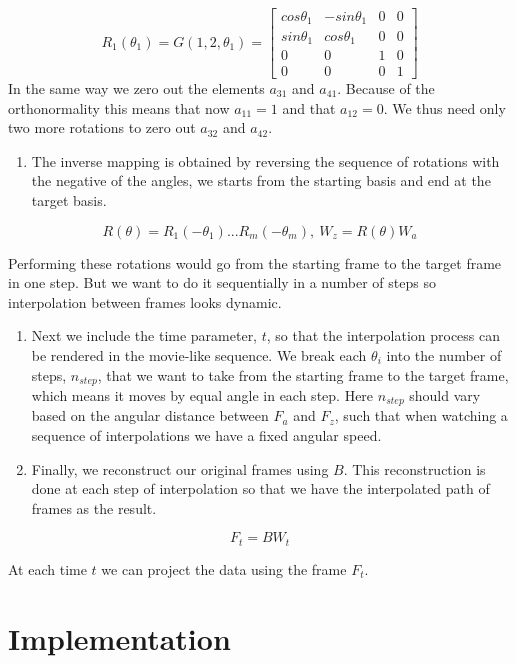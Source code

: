 \[R_1(\theta_1) = G(1, 2, \theta_1) = \begin{bmatrix} cos\theta_1 & -sin\theta_1 & 0 & 0 \\sin\theta_1  &cos\theta_1 & 0 &0 \\ 0&0&1&0 \\0&0&0&1\end{bmatrix}\]
In the same way we zero out the elements \(a_{31}\) and \(a_{41}\). Because of the orthonormality this means that now \(a_{11} = 1\) and that \(a_{12} = 0\). We thus need only two more rotations to zero out \(a_{32}\) and \(a_{42}\).

\begin{enumerate}
\def\labelenumi{\arabic{enumi}.}
\setcounter{enumi}{3}
\tightlist
\item
  The inverse mapping is obtained by reversing the sequence of rotations with the negative of the angles, we starts from the starting basis and end at the target basis.
\end{enumerate}

\[R(\theta) = R_1(-\theta_1) ... R_m(-\theta_m), \    W_z = R(\theta)W_a\]

Performing these rotations would go from the starting frame to the target frame in one step. But we want to do it sequentially in a number of steps so interpolation between frames looks dynamic.

\begin{enumerate}
\def\labelenumi{\arabic{enumi}.}
\setcounter{enumi}{4}
\item
  Next we include the time parameter, \(t\), so that the interpolation process can be rendered in the movie-like sequence. We break each \(\theta_i\) into the number of steps, \(n_{step}\), that we want to take from the starting frame to the target frame, which means it moves by equal angle in each step. Here \(n_{step}\) should vary based on the angular distance between \(F_a\) and \(F_z\), such that when watching a sequence of interpolations we have a fixed angular speed.
\item
  Finally, we reconstruct our original frames using \(B\). This reconstruction is done at each step of interpolation so that we have the interpolated path of frames as the result.
\end{enumerate}

\[F_t = B  W_t\]

At each time \(t\) we can project the data using the frame \(F_t\).

\hypertarget{implementation}{%
\section{Implementation}\label{implementation}}

